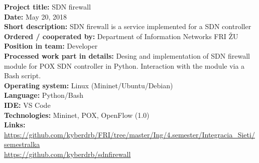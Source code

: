\documentclass[slovak]{article}
\begin{document}
\noindent
\textbf{Project title:} SDN firewall\\
\textbf{Date:} May 20, 2018\\
\textbf{Short description:} SDN firewall is a service implemented for a SDN controller\\
\textbf{Ordered / cooperated by:} Department of Information Networks FRI ŽU\\
\textbf{Position in team:} Developer\\
\textbf{Processed work part in details:} Desing and implementation of SDN firewall module for POX SDN controller in Python. Interaction with the module via a Bash script.\\
\textbf{Operating system:} Linux (Mininet/Ubuntu/Debian)\\
\textbf{Language:} Python/Bash\\
\textbf{IDE:} VS Code\\
\textbf{Technologies:} Mininet, POX, OpenFlow (1.0)\\
\textbf{Links:}\\
\href{https://github.com/kyberdrb/FRI/tree/master/Ing/4.semester/Integracia\_Sieti/semestralka}{https://github.com/kyberdrb/FRI/tree/master/Ing/4.semester/Integracia\_Sieti/semestralka}\\
\href{https://github.com/kyberdrb/sdnfirewall}{https://github.com/kyberdrb/sdnfirewall}
\end{document}
